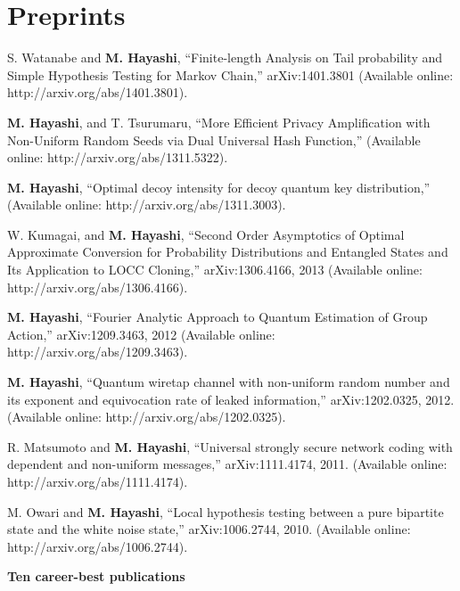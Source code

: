 \section{Preprints}
\begin{enumerate}


S. Watanabe and  \textbf{M. Hayashi},
``Finite-length Analysis on Tail probability and Simple Hypothesis Testing for Markov Chain,''
arXiv:1401.3801
(Available online: http://arxiv.org/abs/1401.3801).


\textbf{M. Hayashi}, and T. Tsurumaru,
``More Efficient Privacy Amplification with Non-Uniform Random Seeds via Dual Universal Hash Function,''
(Available online: http://arxiv.org/abs/1311.5322).

\textbf{M. Hayashi},
``Optimal decoy intensity for decoy quantum key distribution,''
(Available online: http://arxiv.org/abs/1311.3003).
 
W. Kumagai, and \textbf{M. Hayashi},
``Second Order Asymptotics of Optimal Approximate Conversion for Probability Distributions and Entangled States and Its Application to LOCC Cloning,''
arXiv:1306.4166, 2013
(Available online: http://arxiv.org/abs/1306.4166).

\textbf{M. Hayashi},
``Fourier Analytic Approach to Quantum Estimation of Group Action,''
arXiv:1209.3463, 2012
(Available online: http://arxiv.org/abs/1209.3463).


\textbf{M. Hayashi}, 
``Quantum wiretap channel with non-uniform random number and its exponent and equivocation rate of leaked information,''
arXiv:1202.0325, 2012.
(Available online: http://arxiv.org/abs/1202.0325).

R. Matsumoto and \textbf{M. Hayashi},
``Universal strongly secure network coding with dependent and non-uniform messages,''
arXiv:1111.4174, 2011.
(Available online: http://arxiv.org/abs/1111.4174).


M. Owari and \textbf{M. Hayashi}, 
``Local hypothesis testing between a pure bipartite state and the white noise state,''
arXiv:1006.2744, 2010.
(Available online: http://arxiv.org/abs/1006.2744).


\end{enumerate}


\newpage
\textbf{Ten career-best publications}


